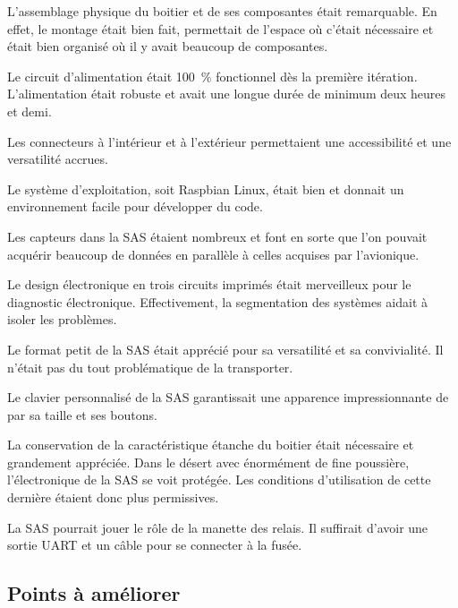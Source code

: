 L’assemblage physique du boitier et de ses composantes était remarquable.
En effet, le montage était bien fait, permettait de l’espace où c’était
nécessaire et était bien organisé où il y avait beaucoup de composantes.
\par
Le circuit d’alimentation était 100~\% fonctionnel dès la première itération.
L’alimentation était robuste et avait une longue durée de minimum deux heures
et demi.
\par
Les connecteurs à l’intérieur et à l’extérieur permettaient une accessibilité
et une versatilité accrues.
\par
Le système d’exploitation, soit Raspbian Linux, était bien et donnait un
environnement facile pour développer du code.
\par
Les capteurs dans la SAS étaient nombreux et font en sorte que l’on pouvait
acquérir beaucoup de données en parallèle à celles acquises par l’avionique.
\par
Le design électronique en trois circuits imprimés était merveilleux pour le
diagnostic électronique. Effectivement, la segmentation des systèmes aidait à
isoler les problèmes.
\par
Le format petit de la SAS était apprécié pour sa versatilité et sa
convivialité. Il n’était pas du tout problématique de la transporter.
\par
Le clavier personnalisé de la SAS garantissait une apparence impressionnante de
par sa taille et ses boutons.
\par
La conservation de la caractéristique étanche du boitier était nécessaire et
grandement appréciée. Dans le désert avec énormément de fine poussière,
l’électronique de la SAS se voit protégée. Les conditions d’utilisation de
cette dernière étaient donc plus permissives.
\par
La SAS pourrait jouer le rôle de la manette des relais. Il suffirait d'avoir une
sortie UART et un câble pour se connecter à la fusée.

\subsection{Points à améliorer}

